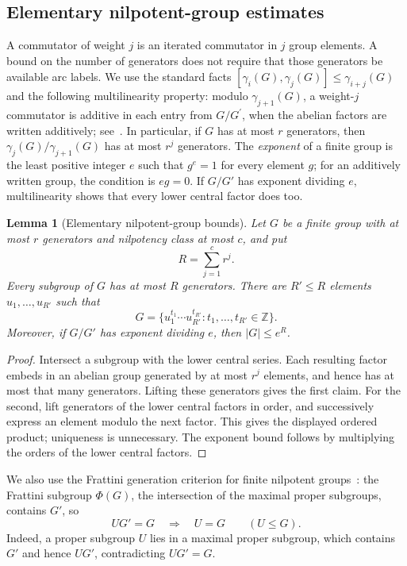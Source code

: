 \documentclass[11pt,a4paper,reqno]{amsart}
\newtheorem{lemma}[theorem]{Lemma}
\theoremstyle{definition}
\theoremstyle{remark}
\numberwithin{equation}{section}
\newcommand{\Z}{\mathbb Z}
\begin{document}
\subsection{Elementary nilpotent-group estimates}\label{subsec:groupfacts}
A commutator of weight $j$ is an iterated commutator in $j$ group elements. A bound on the number of generators does not require that those generators be available arc labels. We use the standard facts $[\gamma_i(G),\gamma_j(G)]\le\gamma_{i+j}(G)$ and the following multilinearity property: modulo $\gamma_{j+1}(G)$, a weight-$j$ commutator is additive in each entry from $G/G^{\prime}$, when the abelian factors are written additively; see~\cite[Theorems 5.1.11 and 5.2.5]{Robinson}. In particular, if $G$ has at most $r$ generators, then $\gamma_j(G)/\gamma_{j+1}(G)$ has at most $r^j$ generators. The \emph{exponent} of a finite group is the least positive integer $e$ such that $g^e=1$ for every element $g$; for an additively written group, the condition is $eg=0$. If $G/G'$ has exponent dividing $e$, multilinearity shows that every lower central factor does too.

\begin{lemma}[Elementary nilpotent-group bounds]\label{lem:coordinates}
Let $G$ be a finite group with at most $r$ generators and nilpotency class at most $c$, and put
\[
 R=\sum_{j=1}^{c}r^j.
\]
Every subgroup of $G$ has at most $R$ generators. There are $R'\le R$ elements $u_1,\ldots,u_{R'}$ such that
\[
 G=\{u_1^{t_1}\cdots u_{R'}^{t_{R'}}:t_1,\ldots,t_{R'}\in\Z\}.
\]
Moreover, if $G/G'$ has exponent dividing $e$, then $|G|\le e^R$.
\end{lemma}
\begin{proof}
Intersect a subgroup with the lower central series. Each resulting factor embeds in an abelian group generated by at most $r^j$ elements, and hence has at most that many generators. Lifting these generators gives the first claim. For the second, lift generators of the lower central factors in order, and successively express an element modulo the next factor. This gives the displayed ordered product; uniqueness is unnecessary. The exponent bound follows by multiplying the orders of the lower central factors.
\end{proof}

We also use the Frattini generation criterion for finite nilpotent groups~\cite[Section 5.3]{Robinson}: the Frattini subgroup $\Phi(G)$, the intersection of the maximal proper subgroups, contains $G'$, so
\begin{equation}\label{eq:frattini-generation}
 UG'=G\quad\Longrightarrow\quad U=G\qquad(U\le G).
\end{equation}
Indeed, a proper subgroup $U$ lies in a maximal proper subgroup, which contains $G'$ and hence $UG'$, contradicting $UG'=G$.
\end{document}
